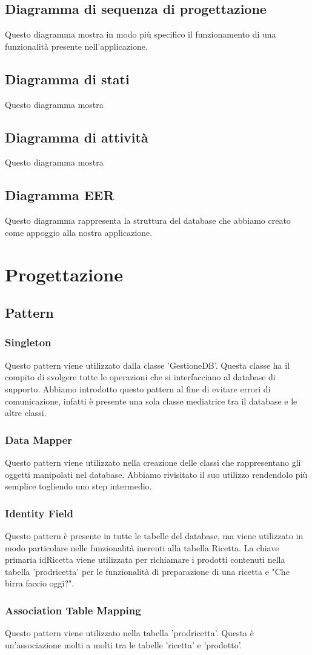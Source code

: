 \documentclass[a4paper, titlepage]{article}
\begin{document}
\newpage

\subsection{Diagramma di sequenza di progettazione}
Questo diagramma mostra in modo più specifico il funzionamento di una funzionalità presente nell'applicazione.
\subsection{Diagramma di stati}
Questo diagramma mostra 
\subsection{Diagramma di attività}
Questo diagramma mostra 
\subsection{Diagramma EER}
Questo diagramma rappresenta la struttura del database che abbiamo creato come appoggio alla nostra applicazione.

\newpage

\section{Progettazione}
\subsection{Pattern}
\subsubsection{Singleton}
Questo pattern viene utilizzato dalla classe 'GestioneDB'. Questa classe ha il compito di svolgere tutte le operazioni che si interfacciano al database di supporto. Abbiamo introdotto questo pattern al fine di evitare errori di comunicazione, infatti è presente una sola classe mediatrice tra il database e le altre classi.
\subsubsection{Data Mapper}
Questo pattern viene utilizzato nella creazione delle classi che rappresentano gli oggetti manipolati nel database.
Abbiamo rivisitato il suo utilizzo rendendolo più semplice togliendo uno step intermedio.
\subsubsection{Identity Field}
Questo pattern è presente in tutte le tabelle del database, ma viene utilizzato in modo particolare nelle funzionalità inerenti alla tabella Ricetta.
La chiave primaria idRicetta viene utilizzata per richiamare i prodotti contenuti nella tabella 'prodricetta' per le funzionalità di preparazione di una ricetta e "Che birra faccio oggi?".
\subsubsection{Association Table Mapping}
Questo pattern viene utilizzato nella tabella 'prodricetta'. Questa è un'associazione molti a molti tra le tabelle 'ricetta' e 'prodotto'.
\end{document}
